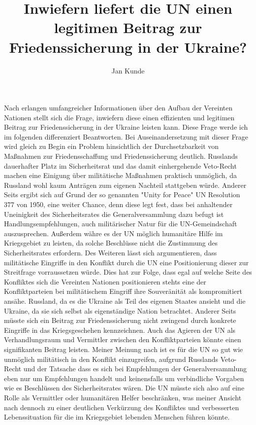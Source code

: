 \documentclass{article}
\author{Jan Kunde}
\date{}
\title{Inwiefern liefert die UN einen legitimen Beitrag zur Friedenssicherung in der Ukraine?}
\begin{document}
\maketitle

\noindent Nach erlangen umfangreicher Informationen über den Aufbau 
der Vereinten Nationen stellt sich die Frage, inwiefern diese einen effizienten und legitimen Beitrag zur Friedenssicherung
in der Ukraine leisten kann. Diese Frage werde ich im folgenden differenziert Beantworten.
\break
\break
Bei Auseinandersetzung mit dieser Frage wird gleich zu Begin ein Problem hinsichtlich der Durchsetzbarkeit von Maßnahmen zur Friedensschaffung und Friedenssicherung deutlich.
Russlands dauerhafter Platz im Sicherheitsrat und das damit einhergehende Veto-Recht machen eine Einigung über militätische Maßnahmen praktisch unmöglich, da Russland wohl kaum Anträgen zum
eigenen Nachteil stattgeben würde.
Anderer Seits ergibt sich auf Grund der so genannten "Unity for Peace" UN Resolution 377 von 1950, eine weiter Chance, denn diese legt fest, dass bei anhaltender Uneinigkeit
des Sicherheitsrates die Generalversammlung dazu befugt ist Handlungsempfehlungen, auch militärischer Natur für die UN-Gemeindschaft auszusprechen. Außerdem währe es der UN möglich humanitäre
Hilfe im Kriegsgebiet zu leisten, da solche Beschlüsse nicht die Zustimmung des Sicherheitsrates erfordern. 
\break
Des Weiteren lässt sich argumentieren, dass militätische Eingriffe in den Konflikt durch die UN eine Positionierung dieser zur Streitfrage vorraussetzen würde. Dies hat zur Folge,
dass egal auf welche Seite des Konfliktes sich die Vereinten Nationen positionieren stehts eine der Konfliktparteien bei militätischem Eingriff ihre Souveränität als kompromitiert
ansähe. Russland, da es die Ukraine als Teil des eigenen Staates ansieht und die Ukraine, da sie sich selbst als eigenständige Nation betrachtet.
\break 
Anderer Seits müsste sich ein Beitrag zur Friedenssicherung nicht zwingend durch konkrete Eingriffe in das Kriegsgeschehen kennzeichnen. Auch das Agieren der UN als Verhandlungsraum und Vermittler zwischen
den Konfliktparteien könnte einen signifikanten Beitrag leisten.
\break
\break
Meiner Meinung nach ist es für die UN so gut wie unmöglich militätisch in den Konflikt einzugreifen, aufgrund Russlands Veto-Recht und der Tatsache dass es sich bei Empfehlungen der
Generalversammlung eben nur um Empfehlungen handelt und keinensfalls um verbindliche Vorgaben wie es Beschlüssen des Sicherheitsrates wären. Die UN müsste sich also auf eine Rolle als
Vermittler oder humanitären Helfer beschränken, was meiner Ansicht nach dennoch zu einer deutlichen Verkürzung des Konfliktes und verbesserten Lebenssituation für die im Kriegsgebiet
lebenden Menschen führen könnte.
\end{document}
